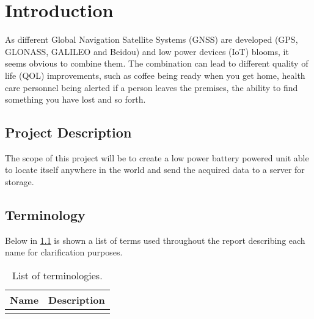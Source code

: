 
\chapter{Introduction}
\label{sec:introduction}
As different Global Navigation Satellite Systems (GNSS) are developed (GPS, GLONASS, GALILEO and Beidou) and low power devices (IoT) blooms, it seems obvious to combine them.
The combination can lead to different quality of life (QOL) improvements, such as coffee being ready when you get home, health care personnel being alerted if a person leaves the premises, the ability to find something you have lost and so forth.

\section{Project Description}
\label{sec:projectDescription}
The scope of this project will be to create a low power battery powered unit able to locate itself anywhere in the world and send the acquired data to a server for storage.

\section{Terminology}
\label{sec:terminology}
Below in \cref{tab:terminology} is shown a list of terms used throughout the report describing each name for clarification purposes.

\begin{table}[H]
	\centering
	\begin{tabularx}{0.8\textwidth}{l X}
		\toprule
		\textbf{Name} & \textbf{Description} \\
		\midrule
		&\\
		\bottomrule
	\end{tabularx}
	\caption{List of terminologies.}
	\label{tab:terminology}
\end{table}